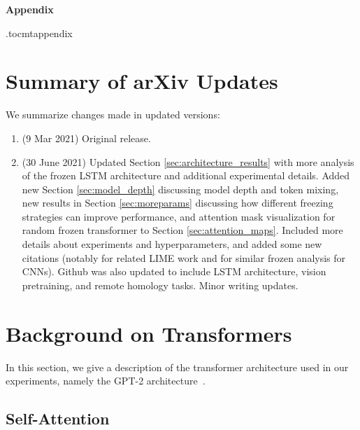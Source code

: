 
\begin{center}{\LARGE{\textbf{Appendix}}}\end{center}

\etocdepthtag.toc{mtappendix}
\tableofcontents

\clearpage

\section{Summary of arXiv Updates}
\label{app:changelog}

We summarize changes made in updated versions:
\begin{enumerate}[label={v\arabic*}.]
    \item (9 Mar 2021) Original release.
    
    \item (30 June 2021) Updated Section \ref{sec:architecture_results} with more analysis of the frozen LSTM architecture and additional experimental details. Added new Section \ref{sec:model_depth} discussing model depth and token mixing, new results in Section \ref{sec:moreparams} discussing how different freezing strategies can improve performance, and attention mask visualization for random frozen transformer to Section \ref{sec:attention_maps}. Included more details about experiments and hyperparameters, and added some new citations (notably \cite{wu2021lime} for related LIME work and \cite{frankle2020batchnorm} for similar frozen analysis for CNNs). Github was also updated to include LSTM architecture, vision pretraining, and remote homology tasks. Minor writing updates.
\end{enumerate}

\section{Background on Transformers}
\label{app:architecture}

In this section, we give a description of the transformer architecture used in our experiments, namely the GPT-2 architecture~\citep{radford2019gpt2}.

\subsection{Self-Attention}

